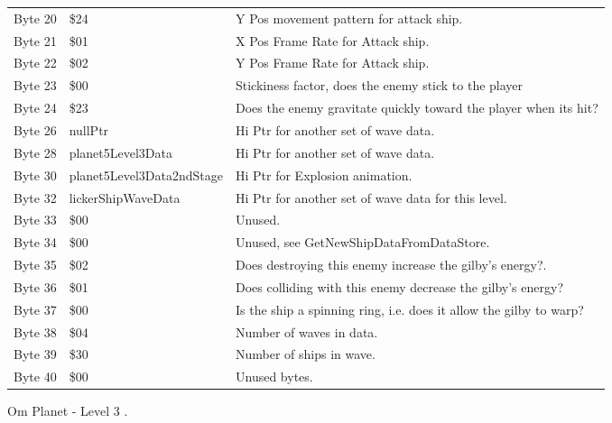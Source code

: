 \begin{figure}[H]
{\begin{adjustbox}{width=12cm}
\begin{tabular}{lll}
 Byte 20 & \$24                       & Y Pos movement pattern for attack ship.                            \\
 Byte 21 & \$01                       & X Pos Frame Rate for Attack ship.                                  \\
 Byte 22 & \$02                       & Y Pos Frame Rate for Attack ship.                                  \\
 Byte 23 & \$00                       & Stickiness factor, does the enemy stick to the player              \\
 Byte 24 & \$23                       & Does the enemy gravitate quickly toward the player when its hit?   \\
 Byte 26 & nullPtr                   & Hi Ptr for another set of wave data.                               \\
 Byte 28 & planet5Level3Data         & Hi Ptr for another set of wave data.                               \\
 Byte 30 & planet5Level3Data2ndStage & Hi Ptr for Explosion animation.                                    \\
 Byte 32 & lickerShipWaveData        & Hi Ptr for another set of wave data for this level.                \\
 Byte 33 & \$00                       & Unused.                                                            \\
 Byte 34 & \$00                       & Unused, see GetNewShipDataFromDataStore.                           \\
 Byte 35 & \$02                       & Does destroying this enemy increase the gilby's energy?.           \\
 Byte 36 & \$01                       & Does colliding with this enemy decrease the gilby's energy?        \\
 Byte 37 & \$00                       & Is the ship a spinning ring, i.e. does it allow the gilby to warp? \\
 Byte 38 & \$04                       & Number of waves in data.                                           \\
 Byte 39 & \$30                       & Number of ships in wave.                                           \\
 Byte 40 & \$00                       & Unused bytes.                                                      \\
\bottomrule
\end{tabular}

  \end{adjustbox}

  }\caption*{Om Planet - Level 3
.}
\end{figure}

